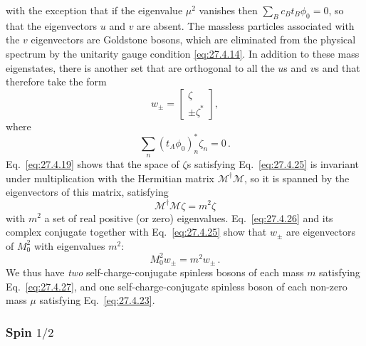 with the exception that if the eigenvalue \(\mu^2\) vanishes then
\(\sum_Bc_Bt_B\phi_0=0\), so that the eigenvectors \(u\) and \(v\) are
absent. The massless particles associated with the \(v\) eigenvectors are
Goldstone bosons, which are eliminated from the physical spectrum by the
unitarity gauge condition \eqref{eq:27.4.14}. In addition to these mass
eigenstates, there is another set that are orthogonal to all the \(u\)s and
\(v\)s and that therefore take the form
\begin{equation}
  w_\pm=
  \begin{bmatrix}
    \zeta\\
    \mathord{\pm}\zeta^*
  \end{bmatrix},
  \tag{27.4.24}\label{eq:27.4.24}
\end{equation}
where
\begin{equation}
  \sum_n(t_A\phi_0)_n^*\zeta_n=0\,.
  \tag{27.4.25}\label{eq:27.4.25}
\end{equation}
Eq.~\eqref{eq:27.4.19} shows that the space of \(\zeta\)s satisfying
Eq.~\eqref{eq:27.4.25} is invariant under multiplication with the Hermitian
matrix \(\mathcal{M}^\dagger\mathcal{M}\), so it is spanned by the
eigenvectors of this matrix, satisfying
\begin{equation}
  \mathcal{M}^\dagger\mathcal{M}\zeta=m^2\zeta
  \tag{27.4.26}\label{eq:27.4.26}
\end{equation}
with \(m^2\) a set of real positive (or zero) eigenvalues.
Eq.~\eqref{eq:27.4.26} and its complex conjugate together with
Eq.~\eqref{eq:27.4.25} show that \(w_\pm\) are eigenvectors of \(M_0^2\)
with eigenvalues \(m^2\):
\begin{equation}
  M_0^2w_\pm=m^2w_\pm\,.
  \tag{27.4.27}\label{eq:27.4.27}
\end{equation}
We thus have \textit{two} self-charge-conjugate spinless bosons of each mass
\(m\) satisfying Eq.~\eqref{eq:27.4.27}, and one self-charge-conjugate
spinless boson of each non-zero mass \(\mu\) satisfying
Eq.~\eqref{eq:27.4.23}.

\subsubsection*{Spin \(1/2\)}

